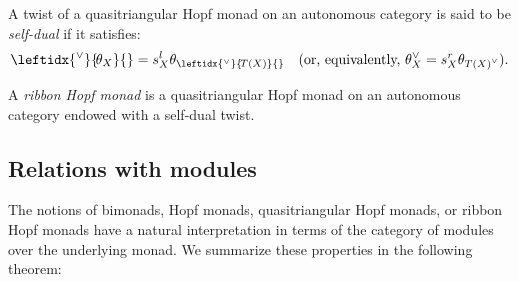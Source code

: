 \documentclass[a4paper]{amsart}
\theoremstyle{definition}
\newcommand{\ldual}[1]{\leftidx{^\vee}{\!#1}{}}
\newcommand{\rdual}[1]{{#1}^\vee}
\begin{document}
A twist of a quasitriangular Hopf monad on an autonomous category is said to be \emph{self-dual} if it satisfies:
\begin{equation*}
\ldual{\theta_X}=s^l_X\theta_{\ldual{T(X)}} \quad \text{(or, equivalently, $\rdual{\theta}_X=s^r_X\theta_{\rdual{T(X)}}$).}
\end{equation*}

A \emph{ribbon Hopf monad} is a quasitriangular Hopf monad on an autonomous category endowed with a self-dual twist.

\subsection{Relations with modules}
The notions of bimonads, Hopf monads, quasitriangular Hopf monads, or ribbon Hopf monads have a natural interpretation in
terms of the category of modules over the underlying monad. We summarize these properties in the following theorem:
\end{document}
